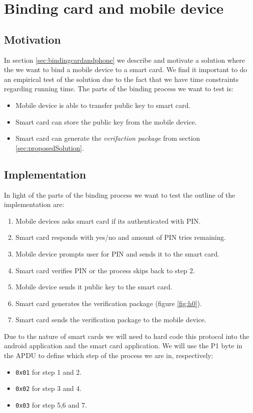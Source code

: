\section{Binding card and mobile device}
\subsection{Motivation}
In section \ref{sec:bindingcardandphone} we describe and motivate a solution where the we want to bind a mobile device to a smart card. We find it important to do an empirical test of the solution due to the fact that we have time constraints regarding running time. The parts of the binding process we want to test is:

\begin{itemize}
    \item Mobile device is able to transfer public key to smart card.
    \item Smart card can store the public key from the mobile device.
    \item Smart card can generate the \textit{verifaction package} from section \ref{sec:proposedSolution}.
\end{itemize}

\subsection{Implementation}
In light of the parts of the binding process we want to test the outline of the implementation are:

\begin{enumerate}
    \item Mobile devices asks smart card if its authenticated with PIN.
    \item Smart card responds with yes/no and amount of PIN tries remaining.
    \item Mobile device prompts user for PIN and sends it to the smart card.
    \item Smart card verifies PIN or the process skips back to step 2.
    \item Mobile device sends it public key to the smart card.
    \item Smart card generates the verification package (figure \ref{fig:h0}).
    \item Smart card sends the verification package to the mobile device.
\end{enumerate}

Due to the nature of smart cards we will need to hard code this protocol into the android application and the smart card application. We will use the P1 byte in the APDU to define which step of the process we are in, respectively:
\begin{itemize}
    \item \texttt{0x01} for step 1 and 2.
    \item \texttt{0x02} for step 3 and 4.
    \item \texttt{0x03} for step 5,6 and 7.
\end{itemize}

